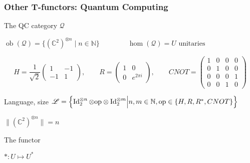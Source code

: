 \documentclass[10pt,handout]{beamer}
\newcommand{\cat}[1]{\mathscr{#1}}
\renewcommand{\L}{\cat{L}}
\newcommand{\size}[1]{\lVert#1\rVert}
\DeclareMathOperator{\ob}{ob}
\DeclareMathOperator{\Id}{Id}
\newcommand{\N}{\mathbb{N}}
\newcommand{\Complex}{\mathbb{C}}
\begin{document}
\begin{frame}
  \frametitle{Other T-functors: Quantum Computing}

  \begin{block}{The QC category $\cat{Q}$}
    \begin{center}
    $\ob(\cat{Q}) = \{\left(\Complex^2\right)^{\otimes n}\;|\;n\in\N\}
    \qquad\qquad \hom(\cat{Q}) = U \text{ unitaries}$
    \end{center}
  \end{block}

  \begin{equation*}
    H = \frac{1}{\sqrt{2}}\begin{pmatrix}
      1 & -1 \\ -1 & 1
    \end{pmatrix},
    \qquad
    R = \begin{pmatrix}
      1 & 0 \\ 0 & e^{2\pi i }
    \end{pmatrix},
    \qquad
    CNOT = \begin{pmatrix}
      1 & 0 & 0 & 0\\
      0 & 1 & 0 & 0\\
      0 & 0 & 0 & 1\\
      0 & 0 & 1 & 0
    \end{pmatrix}
  \end{equation*}

  \begin{block}{Language, size}
    $\L = \Bigl\{\Id_2^{\otimes
      n}\otimes\mathrm{op}\otimes\Id_2^{\otimes m}\Bigl\lvert
    n,m\in\N, \mathrm{op}\in\{H,R,R^\ast,CNOT\} \Bigr\}$

    $\size{(\Complex^2)^{\otimes n}} = n$
  \end{block}
  
  \begin{block}{The functor}
    \begin{center}
      $\ast : U\mapsto U^\ast$
    \end{center}
  \end{block}
\end{frame}
\end{document}
